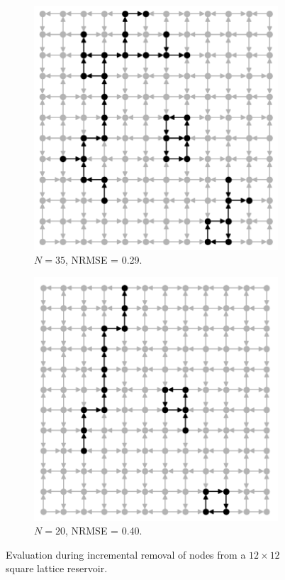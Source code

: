 \begin{figure}[t]
  \begin{subfigure}{.40\textwidth}
    \centering
    \includegraphics[width=1.0\linewidth]{figures/sq-grid-35.png}
    \caption{$N = 35$, NRMSE = 0.29.}
    \label{fig:sq-grid-35}
  \end{subfigure}
  \begin{subfigure}{.40\textwidth}
    \centering
    \includegraphics[width=1.0\linewidth]{figures/sq-grid-20.png}
    \caption{$N = 20$, NRMSE = 0.40.}
    \label{fig:sq-grid-20}
  \end{subfigure}
  \caption{
    Evaluation during incremental removal of nodes from a $12 \times 12$ square
lattice reservoir.
  }
  \label{fig:sq-grid}
\end{figure}

